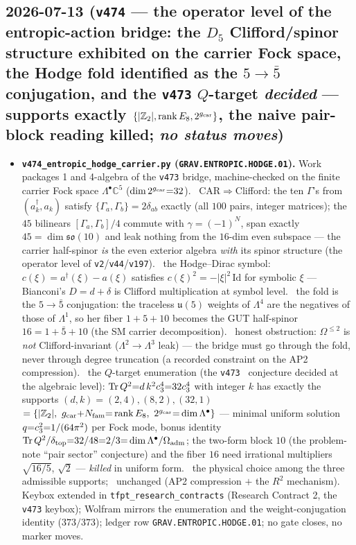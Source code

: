 \subsection*{2026-07-13 (\texttt{v474} --- the operator level of the entropic-action bridge: the $D_5$ Clifford/spinor structure exhibited on the carrier Fock space, the Hodge fold identified as the $5{\to}\bar5$ conjugation, and the \texttt{v473} $Q$-target \emph{decided} --- supports exactly $\{|\mathbb{Z}_2|,\operatorname{rank}E_8,2^{g_{\mathrm{car}}}\}$, the naive pair-block reading killed; \emph{no status moves})}
\begin{itemize}[leftmargin=1.5em]
\item \textbf{\texttt{v474\_entropic\_hodge\_carrier.py} (\texttt{GRAV.ENTROPIC.HODGE.01}).} Work packages
1 and 4-algebra of the \texttt{v473} bridge, machine-checked on the finite carrier Fock space
$\Lambda^\bullet\mathbb C^5$ ($\dim 2^{g_{\mathrm{car}}}{=}32$). \mE\ CAR${\Rightarrow}$Clifford: the ten
$\Gamma$'s from $(a_k^\dagger,a_k)$ satisfy $\{\Gamma_a,\Gamma_b\}{=}2\delta_{ab}$ exactly (all $100$
pairs, integer matrices); the $45$ bilinears $[\Gamma_a,\Gamma_b]/4$ commute with $\gamma{=}(-1)^N$,
span exactly $45{=}\dim\mathfrak{so}(10)$ and leak nothing from the $16$-dim even subspace --- the
carrier half-spinor \emph{is} the even exterior algebra \emph{with} its spinor structure (the operator
level of \texttt{v2}/\texttt{v44}/\texttt{v197}). \mE\ the Hodge--Dirac symbol: $c(\xi){=}a^\dagger(\xi)
{-}a(\xi)$ satisfies $c(\xi)^2{=}-|\xi|^2\,\mathrm{Id}$ for symbolic $\xi$ --- Bianconi's $D{=}d{+}
\delta$ is Clifford multiplication at symbol level. \mE\ the fold is the $5{\to}\bar5$ conjugation:
the traceless $\mathfrak u(5)$ weights of $\Lambda^4$ are the negatives of those of $\Lambda^1$, so her
fiber $1{+}5{+}10$ becomes the GUT half-spinor $16{=}1{+}\bar5{+}10$ (the SM carrier decomposition).
\mE\ honest obstruction: $\Omega^{\le2}$ is \emph{not} Clifford-invariant ($\Lambda^2{\to}\Lambda^3$
leak) --- the bridge must go through the fold, never through degree truncation (a recorded constraint
on the AP2 compression). \mE\ the $Q$-target enumeration (the \texttt{v473} \mC\ conjecture decided at
the algebraic level): $\operatorname{Tr}Q^2{=}d\,k^2c_3^4{=}32c_3^4$ with integer $k$ has
exactly the supports $(d,k){=}(2,4),(8,2),(32,1)$ $=\{|\Z_2|,\ \gcar{+}\Nfam{=}\operatorname{rank}E_8,\
2^{\gcar}{=}\dim\Lambda^\bullet\}$ --- minimal uniform solution $q{=}c_3^2{=}1/(64\pi^2)$ per Fock
mode, bonus identity $\operatorname{Tr}Q^2/\delta_{\mathrm{top}}{=}32/48{=}2/3{=}\dim\Lambda^\bullet/
\Omega_{\mathrm{adm}}$; the two-form block $10$ (the problem-note ``pair sector'' conjecture) and the fiber $16$ need
irrational multipliers $\sqrt{16/5}$, $\sqrt2$ --- \emph{killed} in uniform form. \mC\ the physical
choice among the three admissible supports; \mO\ unchanged (AP2 compression $+$ the $R^2$ mechanism).
Keybox extended in \texttt{tfpt\_research\_contracts} (Research Contract 2, the \texttt{v473} keybox);
Wolfram mirrors the enumeration and the weight-conjugation identity ($373/373$); ledger row
\texttt{GRAV.ENTROPIC.HODGE.01}; no gate closes, no marker moves.
\end{itemize}

